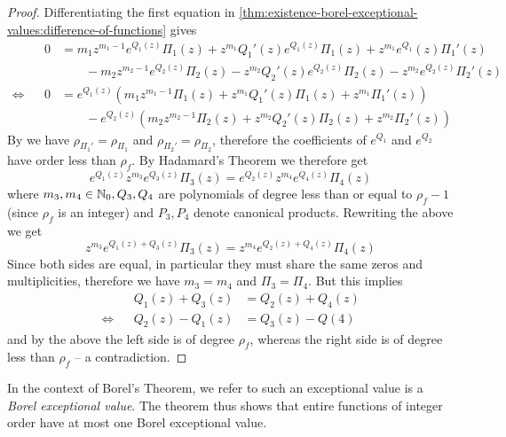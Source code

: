 \begin{proof}
    Differentiating the first equation in \eqref{thm:existence-borel-exceptional-values:difference-of-functions} gives
    \begin{equation*}
    \begin{aligned}
        && 0 &= m_1 z^{m_1 - 1} e^{Q_1(z)} \Pi_1(z) + z^{m_1} Q_1'(z) e^{Q_1(z)} \Pi_1(z) + z^{m_1} e^{Q_1}(z) \Pi_1'(z) \\
        && &\quad\quad - m_2 z^{m_2 - 1} e^{Q_2(z)} \Pi_2(z) - z^{m_2} Q_2'(z) e^{Q_2(z)} \Pi_2(z) - z^{m_2} e^{Q_2(z)} \Pi_2'(z) \\
        \Leftrightarrow && 0 &= e^{Q_1(z)} (m_1 z^{m_1 - 1} \Pi_1(z) + z^{m_1} Q_1'(z) \Pi_1(z) + z^{m_1} \Pi_1'(z)) \\
        && &\quad\quad - e^{Q_2(z)} (m_2 z^{m_2 - 1} \Pi_2(z) + z^{m_2} Q_2'(z) \Pi_2(z) + z^{m_2} \Pi_2'(z))
    \end{aligned}
    \end{equation*}
    By  we have $\rho_{\Pi_1'} = \rho_{\Pi_1}$ and $\rho_{\Pi_2'} = \rho_{\Pi_2}$, therefore the coefficients of $e^{Q_1}$ and $e^{Q_2}$ have order less than $\rho_f$. By Hadamard's Theorem we therefore get
    \begin{equation*}
        e^{Q_1(z)} z^{m_3} e^{Q_3(z)} \Pi_3(z) = e^{Q_2(z)} z^{m_4} e^{Q_4(z)} \Pi_4(z)
    \end{equation*}
    where $m_3, m_4 \in \mathbb{N}_0, Q_3, Q_4$ are polynomials of degree less than or equal to $\rho_f - 1$ (since $\rho_f$ is an integer) and $P_3, P_4$ denote canonical products. Rewriting the above we get
    \begin{equation*}
        z^{m_3} e^{Q_1(z) + Q_3(z)} \Pi_3(z) = z^{m_4} e^{Q_2(z) + Q_4(z)} \Pi_4(z)
    \end{equation*}
    Since both sides are equal, in particular they must share the same zeros and multiplicities, therefore we have $m_3 = m_4$ and $\Pi_3 = \Pi_4$. But this implies
    \begin{equation*}
    \begin{aligned}
        && Q_1(z) + Q_3(z) &= Q_2(z) + Q_4(z) \\
        \Leftrightarrow && Q_2(z) - Q_1(z) &= Q_3(z) - Q(4)
    \end{aligned}
    \end{equation*}
    and by the above the left side is of degree $\rho_f$, whereas the right side is of degree less than $\rho_f$ -- a contradiction.
\end{proof}

In the context of Borel's Theorem, we refer to such an exceptional value is a \emph{Borel exceptional value}. The theorem thus shows that entire functions of integer order have at most one Borel exceptional value.

